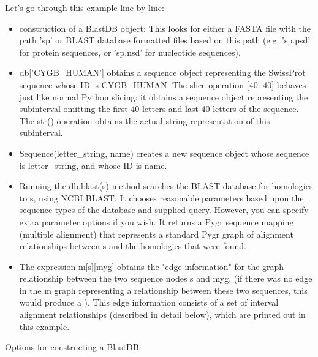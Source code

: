 \documentclass{howto}
\begin{document}
Let's go through this example line by line:

\begin{itemize}

\item    
construction of a BlastDB object: This looks for either a FASTA file with the path 'sp' or BLAST database formatted files based on this path (e.g. 'sp.psd' for protein sequences, or 'sp.nsd' for nucleotide sequences).

\item
db['CYGB_HUMAN'] obtains a sequence object representing the SwissProt sequence whose ID is CYGB_HUMAN.  The slice operation [40:-40] behaves just like normal Python slicing: it obtains a sequence object representing the subinterval omitting the first 40 letters and last 40 letters of the sequence.  The str() operation obtains the actual string representation of this subinterval.

\item
Sequence(letter_string, name) creates a new sequence object whose sequence is letter_string, and whose ID is name.

\item
Running the db.blast(s) method searches the BLAST database for homologies to s, using NCBI BLAST.  It chooses reasonable parameters based upon the sequence types of the database and supplied query.  However, you can specify extra parameter options if you wish.  It returns a Pygr sequence mapping (multiple alignment) that represents a standard Pygr graph of alignment relationships between s and the homologies that were found.

\item
The expression m[s][myg] obtains the "edge information" for the graph relationship between the two sequence nodes s and myg.  (if there was no edge in the m graph representing a relationship between these two sequences, this would produce a 
).  This edge information consists of a set of interval alignment relationships (described in detail below), which are printed out in this example.

\end{itemize}

Options for constructing a BlastDB:
\end{document}
